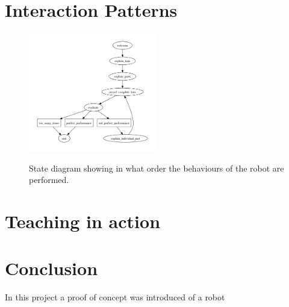\documentclass[10pt,a4paper,oneside]{scrartcl}
\begin{document}
\section{Interaction Patterns}


\begin{figure}[!ht]
	\centering
	\includegraphics[width=0.5\textwidth]{images/stateDiagram}
	\label{fig:state-diagram}
	\caption{State diagram showing in what order the behaviours of the robot are performed.}
\end{figure}

\section{Teaching in action}

\section{Conclusion}
In this project a proof of concept was introduced of a robot  


\printbibliography
\end{document}
